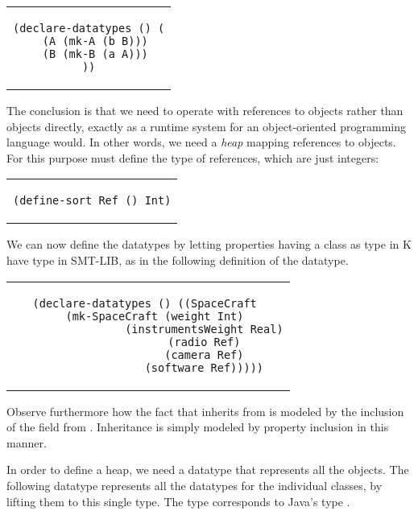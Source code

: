 \lstset{language=SMT}

\begin{center}
\begin{tabular}{c}
\begin{lstlisting}
(declare-datatypes () (
  (A (mk-A (b B)))
  (B (mk-B (a A)))
))
\end{lstlisting}
\end{tabular}
\end{center}

The conclusion is that we need to operate with references to 
objects rather than objects directly, exactly as a runtime system 
for an object-oriented programming language would. In other words, 
we need a {\em heap} mapping references to objects. For this 
purpose must define the type of references, which are just 
integers:

\begin{center}
\begin{tabular}{c}
\begin{lstlisting}
(define-sort Ref () Int)
\end{lstlisting}
\end{tabular}
\end{center}

We can now define the datatypes by letting properties having a 
class as type in K have type  in SMT-LIB, as in the 
following definition of the  datatype.

\begin{center}
\begin{tabular}{c}
\begin{lstlisting}  
(declare-datatypes () ((SpaceCraft 
  (mk-SpaceCraft (weight Int)
                 (instrumentsWeight Real)
                 (radio Ref)
                 (camera Ref)
                 (software Ref)))))
\end{lstlisting}
\end{tabular}
\end{center}

Observe furthermore how the fact that  inherits
from  is modeled by the inclusion of the 
field from . Inheritance is simply modeled by
property inclusion in this manner. 

In order to define a heap, we need a datatype that represents all 
the objects. The following datatype  represents all the 
datatypes for the individual classes, by lifting them to this single type. The type  corresponds to Java's type .

